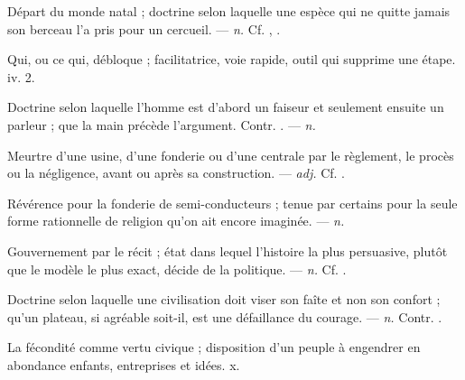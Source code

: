  Départ du monde natal ; doctrine selon laquelle une espèce qui ne quitte jamais son berceau l'a pris pour un cercueil. ---  \textit{n.} Cf. , .

 Qui, ou ce qui, débloque ; facilitatrice, voie rapide, outil qui supprime une étape.   iv. 2.

 Doctrine selon laquelle l'homme est d'abord un faiseur et seulement ensuite un parleur ; que la main précède l'argument. Contr. . ---  \textit{n.}

 Meurtre d'une usine, d'une fonderie ou d'une centrale par le règlement, le procès ou la négligence, avant ou après sa construction. ---  \textit{adj.} Cf. .

 Révérence pour la fonderie de semi-conducteurs ; tenue par certains pour la seule forme rationnelle de religion qu'on ait encore imaginée.   ---  \textit{n.}

 Gouvernement par le récit ; état dans lequel l'histoire la plus persuasive, plutôt que le modèle le plus exact, décide de la politique.  ---  \textit{n.} Cf. .

 Doctrine selon laquelle une civilisation doit viser son faîte et non son confort ; qu'un plateau, si agréable soit-il, est une défaillance du courage. ---  \textit{n.} Contr. .

 La fécondité comme vertu civique ; disposition d'un peuple à engendrer en abondance enfants, entreprises et idées.   x.

